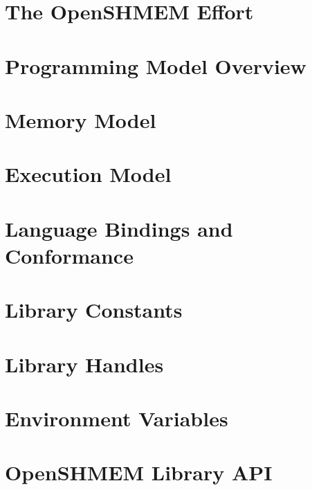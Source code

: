 \documentclass[10pt]{book}
\begin{document}




\section{The OpenSHMEM Effort}\label{subsec:openshmem_effort}


\section{Programming Model Overview}\label{subsec:programming_model}


\section{Memory Model}\label{subsec:memory_model}


\section{Execution Model}\label{subsec:execution_model}


\section{Language Bindings and Conformance}\label{subsec:bindings}


\section{Library Constants}\label{subsec:library_constants}


\section{Library Handles}\label{subsec:library_handles}


\section{Environment Variables }\label{subsec:environment_variables}


\clearpage



\section{OpenSHMEM Library API}\label{sec:openshmem_library_api}
\end{document}
